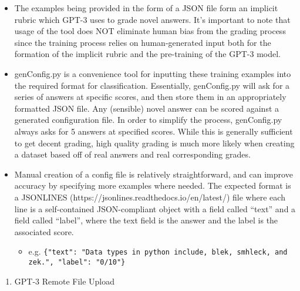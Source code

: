 \documentclass[
]{article}
\begin{document}
\begin{itemize}
\item
  The examples being provided in the form of a JSON file form an
  implicit rubric which GPT-3 uses to grade novel answers. It's
  important to note that usage of the tool does NOT eliminate human bias
  from the grading process since the training process relies on
  human-generated input both for the formation of the implicit rubric
  and the pre-training of the GPT-3 model.
\item
  genConfig.py is a convenience tool for inputting these training
  examples into the required format for classification. Essentially,
  genConfig.py will ask for a series of answers at specific scores, and
  then store them in an appropriately formatted JSON file. Any
  (sensible) novel answer can be scored against a generated
  configuration file. In order to simplify the process, genConfig.py
  always asks for 5 answers at specified scores. While this is generally
  sufficient to get decent grading, high quality grading is much more
  likely when creating a dataset based off of real answers and real
  corresponding grades.
\item
  Manual creation of a config file is relatively straightforward, and
  can improve accuracy by specifying more examples where needed. The
  expected format is a JSONLINES
  (https://jsonlines.readthedocs.io/en/latest/) file where each line is
  a self-contained JSON-compliant object with a field called ``text''
  and a field called ``label'', where the text field is the answer and
  the label is the associated score.

  \begin{itemize}
  \itemsep1pt\parskip0pt
  \item
    e.g.
    \texttt{\{"text": "Data types in python include, blek, smhleck, and zek.", "label": "0/10"\}}
  \end{itemize}
\end{itemize}

\begin{enumerate}
\def\labelenumi{\arabic{enumi}.}
\setcounter{enumi}{2}
\itemsep1pt\parskip0pt
\item
  GPT-3 Remote File Upload
\end{enumerate}
\end{document}
